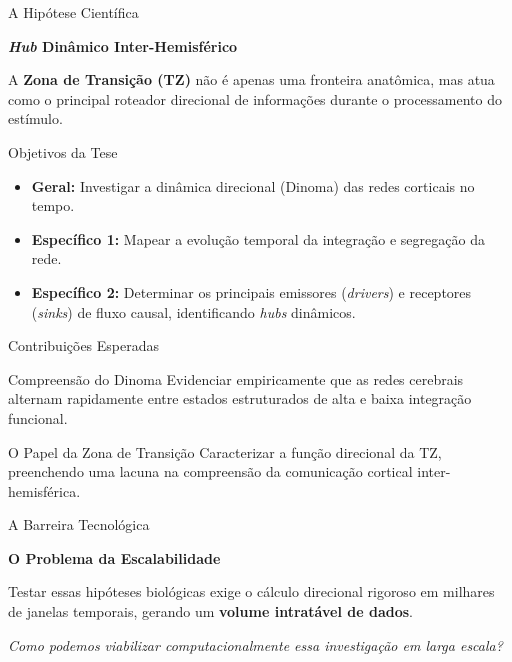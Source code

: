 \documentclass[10pt]{beamer}
\begin{document}
\begin{frame}{A Hipótese Científica}
    \centering
    \vspace{1.5cm}
    
    \Large \textbf{\textit{Hub} Dinâmico Inter-Hemisférico}
    
    \vspace{1cm}
    \normalsize
    A \textbf{Zona de Transição (TZ)} não é apenas uma fronteira anatômica, mas atua como o principal roteador direcional de informações durante o processamento do estímulo.
\end{frame}

\begin{frame}{Objetivos da Tese}
    \vspace{0.5cm}
    \begin{itemize}
        \item \textbf{Geral:} Investigar a dinâmica direcional (Dinoma) das redes corticais no tempo.
        \vspace{0.8cm}
        \item \textbf{Específico 1:} Mapear a evolução temporal da integração e segregação da rede.
        \vspace{0.8cm}
        \item \textbf{Específico 2:} Determinar os principais emissores (\textit{drivers}) e receptores (\textit{sinks}) de fluxo causal, identificando \textit{hubs} dinâmicos.
    \end{itemize}
\end{frame}

\begin{frame}{Contribuições Esperadas}
    \begin{alertblock}{Compreensão do Dinoma}
        Evidenciar empiricamente que as redes cerebrais alternam rapidamente entre estados estruturados de alta e baixa integração funcional.
    \end{alertblock}
    
    \vspace{0.5cm}
    \begin{alertblock}{O Papel da Zona de Transição}
        Caracterizar a função direcional da TZ, preenchendo uma lacuna na compreensão da comunicação cortical inter-hemisférica.
    \end{alertblock}
\end{frame}

\begin{frame}{A Barreira Tecnológica}
    \centering
    \vspace{1.5cm}
    
    \Large \textbf{O Problema da Escalabilidade}
    
    \vspace{1cm}
    \normalsize
    Testar essas hipóteses biológicas exige o cálculo direcional rigoroso em milhares de janelas temporais, gerando um \textbf{volume intratável de dados}.
    
    \vspace{1.5cm}
    \textit{Como podemos viabilizar computacionalmente essa investigação em larga escala?}
\end{frame}
\end{document}

